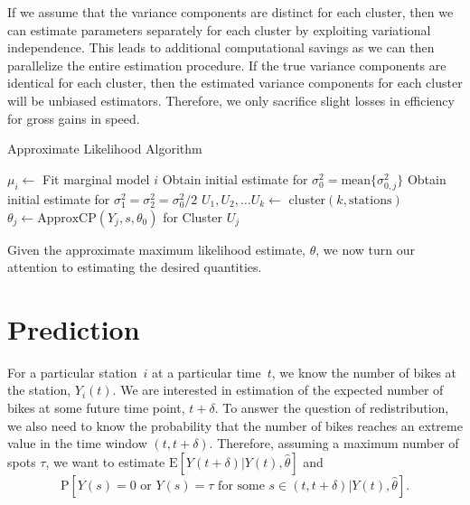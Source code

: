 \documentclass{acm_proc_article-sp}
\begin{document}
If we assume that the variance components are distinct for each cluster, then we can estimate parameters separately for each cluster by exploiting variational independence.  This leads to additional computational savings as we can then parallelize the entire estimation procedure.  If the true variance components are identical for each cluster, then the estimated variance components for each cluster will be unbiased estimators.  Therefore, we only sacrifice slight losses in efficiency for gross gains in speed.  

\begin{algorithm}[!h]
\caption{Approximate Likelihood Algorithm} \label{applik_alg}
\begin{algorithmic}
\STATE $\mu_i \gets$ Fit marginal model $i$ 
\ENDFOR
\STATE Obtain initial estimate for $\sigma_0^2 = \text{mean} \{ \sigma_{0,j}^2\}$
\STATE Obtain initial estimate for $\sigma_1^2 = \sigma_2^2 = \sigma_0^2 / 2$
\STATE $U_1, U_2, \ldots U_k \gets$ cluster$(k, \text{stations})$
\STATE $\theta_j \gets \text{ApproxCP} (Y_j, s, \theta_0)$ for Cluster $U_j$
\ENDFOR
\end{algorithmic}
\end{algorithm}

Given the approximate maximum likelihood estimate, $\theta$, we now turn our attention to estimating the desired quantities.

\section{Prediction}

For a particular station~$i$ at a particular time~$t$, we know the number of bikes at the station, $Y_i(t)$.  We are interested in estimation of the expected number of bikes at some future time point, $t+\delta$.  To answer the question of redistribution, we also need to know the probability that the number of bikes reaches an extreme value in the time window $(t, t+\delta)$.  Therefore, assuming a maximum number of spots $\tau$, we want to estimate $\text{E} \left[ Y(t+ \delta) | Y(t) , \hat{\theta} \right]$ and 
\begin{equation*}
\text{P} [ Y(s) = 0 \text{ or } Y(s) = \tau \text{ for some } s \in (t, t+\delta) | Y(t), \hat{\theta} ].  
\end{equation*}
\end{document}
